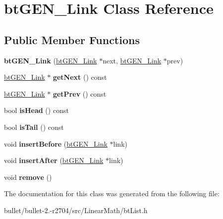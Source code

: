 \hypertarget{classbt_g_e_n___link}{\section{bt\+G\+E\+N\+\_\+\+Link Class Reference}
\label{classbt_g_e_n___link}
}
\subsection*{Public Member Functions}
\begin{DoxyCompactItemize}
\item 
\hypertarget{classbt_g_e_n___link_afaba3db8d7d56d142b31d55cc5a10bc4}{{\bfseries bt\+G\+E\+N\+\_\+\+Link} (\hyperlink{classbt_g_e_n___link}{bt\+G\+E\+N\+\_\+\+Link} $\ast$next, \hyperlink{classbt_g_e_n___link}{bt\+G\+E\+N\+\_\+\+Link} $\ast$prev)}\label{classbt_g_e_n___link_afaba3db8d7d56d142b31d55cc5a10bc4}

\item 
\hypertarget{classbt_g_e_n___link_aaf9ba4caa95837345940edd60278da1c}{\hyperlink{classbt_g_e_n___link}{bt\+G\+E\+N\+\_\+\+Link} $\ast$ {\bfseries get\+Next} () const }\label{classbt_g_e_n___link_aaf9ba4caa95837345940edd60278da1c}

\item 
\hypertarget{classbt_g_e_n___link_a8d0f7afb7cd8627cbf1342d6b3c9d56b}{\hyperlink{classbt_g_e_n___link}{bt\+G\+E\+N\+\_\+\+Link} $\ast$ {\bfseries get\+Prev} () const }\label{classbt_g_e_n___link_a8d0f7afb7cd8627cbf1342d6b3c9d56b}

\item 
\hypertarget{classbt_g_e_n___link_a4ef2b0d551e0602e0ccbcb10df6632a1}{bool {\bfseries is\+Head} () const }\label{classbt_g_e_n___link_a4ef2b0d551e0602e0ccbcb10df6632a1}

\item 
\hypertarget{classbt_g_e_n___link_a5f2730708d99cea4e70faa656f4b6ff6}{bool {\bfseries is\+Tail} () const }\label{classbt_g_e_n___link_a5f2730708d99cea4e70faa656f4b6ff6}

\item 
\hypertarget{classbt_g_e_n___link_af9a44671d7450b325ad0805b01eed382}{void {\bfseries insert\+Before} (\hyperlink{classbt_g_e_n___link}{bt\+G\+E\+N\+\_\+\+Link} $\ast$link)}\label{classbt_g_e_n___link_af9a44671d7450b325ad0805b01eed382}

\item 
\hypertarget{classbt_g_e_n___link_a5cd8cbf3991ce5c33771ce3abcc54cd5}{void {\bfseries insert\+After} (\hyperlink{classbt_g_e_n___link}{bt\+G\+E\+N\+\_\+\+Link} $\ast$link)}\label{classbt_g_e_n___link_a5cd8cbf3991ce5c33771ce3abcc54cd5}

\item 
\hypertarget{classbt_g_e_n___link_ac2fcb105c73b7e9473d2cdca22d26c7b}{void {\bfseries remove} ()}\label{classbt_g_e_n___link_ac2fcb105c73b7e9473d2cdca22d26c7b}

\end{DoxyCompactItemize}


The documentation for this class was generated from the following file\+:\begin{DoxyCompactItemize}
\item 
bullet/bullet-\/2.-\/r2704/src/\+Linear\+Math/bt\+List.\+h\end{DoxyCompactItemize}
